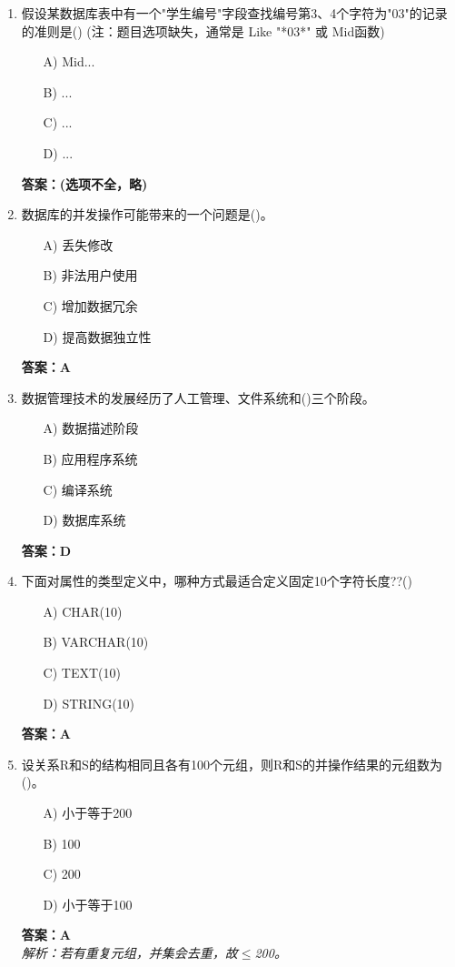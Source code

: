 \documentclass[a4paper,12pt]{article}
\begin{document}
\begin{enumerate}[label=\arabic*.]
\item 假设某数据库表中有一个"学生编号"字段查找编号第3、4个字符为"03"的记录的准则是() (注：题目选项缺失，通常是 Like "*03*" 或 Mid函数)
\begin{itemize}
    \item[A)] Mid...
    \item[B)] ...
    \item[C)] ...
    \item[D)] ...
\end{itemize}
\textbf{答案：(选项不全，略)}

\item 数据库的并发操作可能带来的一个问题是()。
\begin{itemize}
    \item[A)] 丢失修改
    \item[B)] 非法用户使用
    \item[C)] 增加数据冗余
    \item[D)] 提高数据独立性
\end{itemize}
\textbf{答案：A}

\item 数据管理技术的发展经历了人工管理、文件系统和()三个阶段。
\begin{itemize}
    \item[A)] 数据描述阶段
    \item[B)] 应用程序系统
    \item[C)] 编译系统
    \item[D)] 数据库系统
\end{itemize}
\textbf{答案：D}

\item 下面对属性的类型定义中，哪种方式最适合定义固定10个字符长度??()
\begin{itemize}
    \item[A)] CHAR(10)
    \item[B)] VARCHAR(10)
    \item[C)] TEXT(10)
    \item[D)] STRING(10)
\end{itemize}
\textbf{答案：A}

\item 设关系R和S的结构相同且各有100个元组，则R和S的并操作结果的元组数为()。
\begin{itemize}
    \item[A)] 小于等于200
    \item[B)] 100
    \item[C)] 200
    \item[D)] 小于等于100
\end{itemize}
\textbf{答案：A} \\
\textit{解析：若有重复元组，并集会去重，故$\le$200。}


\end{enumerate}
\end{document}
